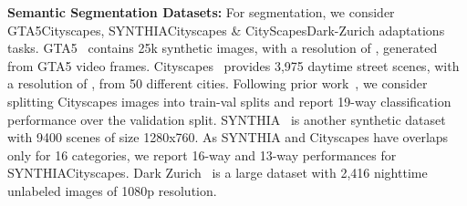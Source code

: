\documentclass[10pt,twocolumn,letterpaper]{article}
\begin{document}
\noindent \textbf{Semantic Segmentation Datasets:}
For segmentation, we consider GTA5Cityscapes, SYNTHIACityscapes \& CityScapesDark-Zurich adaptations tasks. GTA5~\cite{richter2016playing} contains 25k synthetic images, with a resolution of , generated from GTA5 video frames. Cityscapes~\cite{cordts2016cityscapes} provides 3,975 daytime street scenes, with a resolution of , from 50 different cities. Following prior work~\cite{hoffman2018cycada,vu2019advent,zou2019confidence}, we consider splitting Cityscapes images into train-val splits and report 19-way classification performance over the validation split. SYNTHIA~\cite{ros2016synthia} is another synthetic dataset with 9400 scenes of size 1280x760. As SYNTHIA and Cityscapes have overlaps only for 16 categories, we report 16-way and 13-way performances for SYNTHIACityscapes. Dark Zurich~\cite{sakaridis2019guided} is a large dataset with 2,416 nighttime unlabeled images of 1080p resolution.
\end{document}
